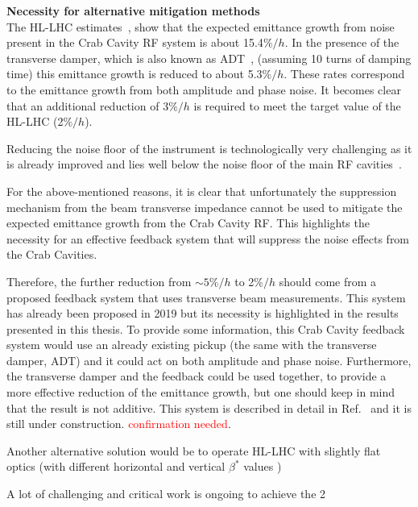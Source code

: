 \textbf{Necessity for alternative mitigation methods}\\
The HL-LHC estimates~\cite{cc_noise_hl_lhc_estimates}, show that the expected emittance growth from noise present in the Crab Cavity RF system is about 15.4$\%/h$. In the presence of the transverse damper, which is also known as ADT~\cite{lhc_adt_info_presentation}, (assuming 10 turns of damping time) this emittance growth is reduced to about 5.3$\%/h$. These rates correspond to the emittance growth from both amplitude and phase noise. It becomes clear that an additional reduction of 3$\%/h$ is required to meet the target value of the HL-LHC (2$\%/h$).

Reducing the noise floor of the instrument is technologically very challenging as it is already improved and lies well below the noise floor of the main RF cavities~\cite{cc_noise_hl_lhc_estimates}. %

For the above-mentioned reasons, it is clear that unfortunately the suppression mechanism from the beam transverse impedance cannot be used to mitigate the expected emittance growth from the Crab Cavity RF. This highlights the necessity for an effective feedback system that will suppress the noise effects from the Crab Cavities. 

Therefore, the further reduction from $\sim 5\%/h$ to 2$\%/h$ should come from a proposed feedback system that uses transverse beam measurements. This system has already been proposed in 2019 but its necessity is highlighted in the results presented in this thesis. To provide some information, this Crab Cavity feedback system would use an already existing pickup (the same with the transverse damper, ADT) and it could act on both amplitude and phase noise.  Furthermore, the transverse damper and the feedback could be used together, to provide a more effective reduction of the emittance growth, but one should keep in mind that the result is not additive. This system is described in detail in  Ref.~\cite{Baudrenghien:2665950} and it is still under construction. \textcolor{red}{confirmation needed}. %

Another alternative solution would be to operate HL-LHC with slightly flat optics (with different horizontal and vertical $\beta^{\ast}$ values )




A lot of challenging and critical work is ongoing to achieve the 2%



